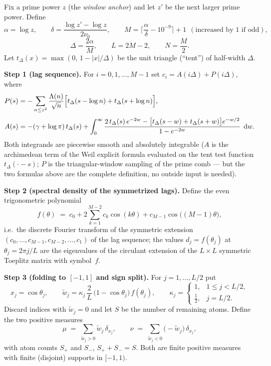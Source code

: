 \documentclass[11pt]{article}
\theoremstyle{remark}
\newcommand{\dd}{\,\mathrm{d}}
\begin{document}
Fix a prime power $z$ (the \emph{window anchor}) and let $z'$ be the
next larger prime power.  Define
\[
\alpha=\log z,\qquad
\delta=\frac{\log z'-\log z}{2\nu_{0}},\qquad
M=\Big\lceil \frac{\alpha}{\delta}-10^{-9}\Big\rceil+1
\ \ (\text{increased by }1\text{ if odd}),
\]
\[
\Delta=\frac{2\alpha}{M},\qquad
L=2M-2,\qquad
N=\frac{M}{2}.
\]
Let $t_{\Delta}(x)=\max(0,\,1-|x|/\Delta)$ be the unit triangle
(``tent'') of half-width $\Delta$.

\medskip\noindent
\textbf{Step 1 (lag sequence).}  For $i=0,1,\dots,M-1$ set
$c_{i}=A(i\Delta)+P(i\Delta)$, where
\begin{align}
P(s) &= -\sum_{n\le z^{2}}\frac{\Lambda(n)}{\sqrt{n}}
  \Bigl[t_{\Delta}(s-\log n)+t_{\Delta}(s+\log n)\Bigr],
  \label{eq:P}\\[1mm]
A(s) &= -(\gamma+\log\pi)\,t_{\Delta}(s)
  +\int_{0}^{\infty}
  \frac{2\,t_{\Delta}(s)\,e^{-2w}
        -\bigl[t_{\Delta}(s-w)+t_{\Delta}(s+w)\bigr]e^{-w/2}}
       {1-e^{-2w}}\;\dd w .
  \label{eq:A}
\end{align}
Both integrands are piecewise smooth and absolutely integrable ($A$ is
the archimedean term of the Weil explicit formula evaluated on the
tent test function $t_{\Delta}(\cdot-s)$; $P$ is the triangular-window
sampling of the prime comb --- but the two formulas above are the
complete definition, no outside input is needed).

\medskip\noindent
\textbf{Step 2 (spectral density of the symmetrized lags).}  Define
the even trigonometric polynomial
\begin{equation}\label{eq:symbol}
f(\theta)\;=\;c_{0}+2\sum_{k=1}^{M-2}c_{k}\cos(k\theta)
              +c_{M-1}\cos\bigl((M-1)\theta\bigr),
\end{equation}
i.e.\ the discrete Fourier transform of the symmetric extension
$(c_{0},\dots,c_{M-1},c_{M-2},\dots,c_{1})$ of the lag sequence; the
values $d_{j}=f(\theta_{j})$ at $\theta_{j}=2\pi j/L$ are the
eigenvalues of the circulant extension of the $L\times L$ symmetric
Toeplitz matrix with symbol~$f$.

\medskip\noindent
\textbf{Step 3 (folding to $[-1,1]$ and sign split).}
For $j=1,\dots,L/2$ put
\begin{equation}\label{eq:atoms}
x_{j}=\cos\theta_{j},\qquad
\widetilde w_{j}
  =\kappa_{j}\,\frac{2}{L}\,\bigl(1-\cos\theta_{j}\bigr)\,
   f(\theta_{j}),
\qquad
\kappa_{j}=\begin{cases}1,& 1\le j<L/2,\\[0.5mm]
\tfrac12,& j=L/2 .\end{cases}
\end{equation}
Discard indices with $\widetilde w_{j}=0$ and let $S$ be the number of
remaining atoms.  Define the two positive measures
\begin{equation}\label{eq:munu}
\mu \;=\; \sum_{\widetilde w_{j}>0}\widetilde w_{j}\,\delta_{x_{j}},
\qquad
\nu \;=\; \sum_{\widetilde w_{j}<0}\bigl(-\widetilde w_{j}\bigr)\,
          \delta_{x_{j}},
\end{equation}
with atom counts $S_{+}$ and $S_{-}$, $S_{+}+S_{-}=S$.  Both are
finite positive measures with finite (disjoint) supports in $[-1,1)$.
\end{document}
